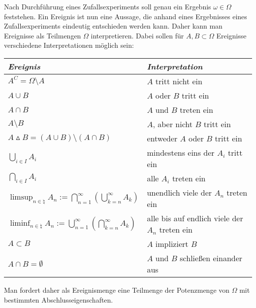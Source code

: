 \begin{Bem}
    Nach Durchführung eines Zufallsexperiments soll genau ein Ergebnis $\omega \in \Omega$
    feststehen.
    Ein Ereignis ist nun eine Aussage, die anhand eines Ergebnisses eines Zufallsexperiments
    eindeutig entschieden werden kann.
    Daher kann man Ereignisse als Teilmengen $\Omega$ interpretieren.
    Dabei sollen für $A, B \subset \Omega$ Ereignisse verschiedene Interpretationen möglich sein:
    
    \begin{tabular}{p{60mm}p{100mm}}
        \toprule
        \emph{Ereignis} &
        \emph{Interpretation}\\
        
        \midrule
        
        $A^C = \Omega \setminus A$ &
        $A$ tritt nicht ein \\
        
        $A \cup B$ &
        $A$ oder $B$ tritt ein \\
        
        $A \cap B$ &
        $A$ und $B$ treten ein \\
        
        $A \setminus B$ &
        $A$, aber nicht $B$ tritt ein \\
        
        $A \vartriangle B = (A \cup B) \setminus (A \cap B)$ &
        entweder $A$ oder $B$ tritt ein \\
        
        $\bigcup_{i \in I} A_i$ &
        mindestens eins der $A_i$ tritt ein \\
        
        $\bigcap_{i \in I} A_i$ &
        alle $A_i$ treten ein \\
        
        $\limsup_{n \in \natural} A_n :=
        \bigcap_{n=1}^\infty \left(\bigcup_{k=n}^\infty A_k\right)$ &
        unendlich viele der $A_n$ treten ein \\
        
        $\liminf_{n \in \natural} A_n :=
        \bigcup_{n=1}^\infty \left(\bigcap_{k=n}^\infty A_k\right)$ &
        alle bis auf endlich viele der $A_n$ treten ein \\
        
        $A \subset B$ &
        $A$ impliziert $B$ \\
        
        $A \cap B = \emptyset$ &
        $A$ und $B$ schließen einander aus \\
        
        \bottomrule
    \end{tabular}
    
    Man fordert daher als Ereignismenge eine Teilmenge der Potenzmenge von $\Omega$ mit bestimmten
    Abschlusseigenschaften.
\end{Bem}

